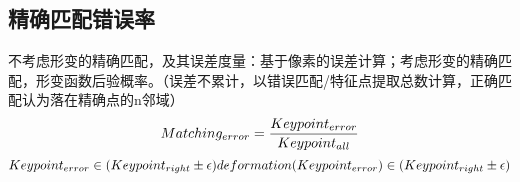 \subsection{精确匹配错误率}

不考虑形变的精确匹配，及其误差度量：基于像素的误差计算；考虑形变的精确匹配，形变函数后验概率。（误差不累计，以错误匹配/特征点提取总数计算，正确匹配认为落在精确点的n邻域）
\begin{equation}
    Matching_{error} = \frac{Keypoint_{error}}{Keypoint_{all}} 
    \label{equ:Matching_{error}}
\end{equation}
\begin{equation}
    Keypoint_{error} \in (Keypoint_{right}  \pm \epsilon) \\ 
    deformation(Keypoint_{error}) \in (Keypoint_{right}  \pm \epsilon)
    \label{equ:keypoint_{error}}
\end{equation}